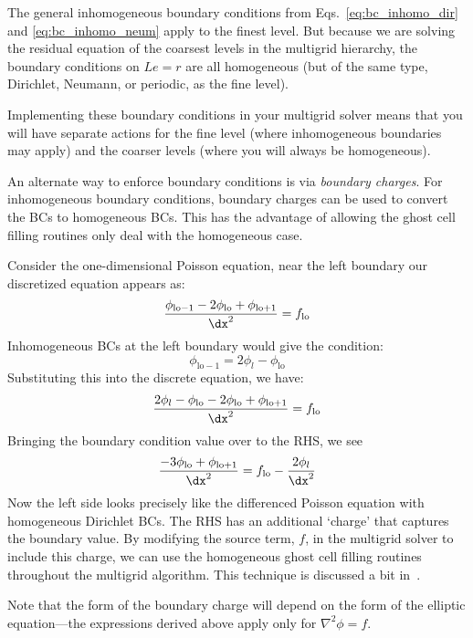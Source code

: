 The general inhomogeneous boundary conditions from
Eqs.~\ref{eq:bc_inhomo_dir} and \ref{eq:bc_inhomo_neum} apply to the
finest level.  But because we are solving the residual equation of the
coarsest levels in the multigrid hierarchy, the boundary conditions on
$Le = r$ are all homogeneous (but of the same type, Dirichlet,
Neumann, or periodic, as the fine level).

Implementing these boundary conditions in your multigrid solver means
that you will have separate actions for the fine level (where
inhomogeneous boundaries may apply) and the coarser levels (where you
will always be homogeneous).

An alternate way to enforce boundary conditions is via {\em boundary
  charges}.  For inhomogeneous boundary conditions, boundary charges
can be used to convert the BCs to homogeneous BCs.  This has the
advantage of allowing the ghost cell filling routines only deal with
the homogeneous case.

Consider the one-dimensional Poisson equation, near the left boundary
our discretized equation appears as:
\begin{equation}
\frac{\phi_\mathrm{lo-1} - 2\phi_\mathrm{lo} + \phi_\mathrm{lo+1}}{\dx^2}
 = f_\mathrm{lo}
\end{equation}
Inhomogeneous BCs at the left boundary would give the condition:
\begin{equation}
\phi_\mathrm{lo-1} = 2 \phi_l - \phi_\mathrm{lo}
\end{equation}
Substituting this into the discrete equation, we have:
\begin{equation}
\frac{2 \phi_l - \phi_\mathrm{lo} - 2\phi_\mathrm{lo} + \phi_\mathrm{lo+1}}{\dx^2}
 = f_\mathrm{lo}
\end{equation}
Bringing the boundary condition value over to the RHS, we see
\begin{equation}
\frac{- 3\phi_\mathrm{lo} + \phi_\mathrm{lo+1}}{\dx^2}
 = f_\mathrm{lo} - \frac{2\phi_l}{\dx^2}
\end{equation}
Now the left side looks precisely like the differenced Poisson equation
with homogeneous Dirichlet BCs.  The RHS has an additional `charge' that
captures the boundary value.  By modifying the source term, $f$, in the
multigrid solver to include this charge, we can use the homogeneous 
ghost cell filling routines throughout the multigrid algorithm.
This technique is discussed a bit in~\cite{colellanotes}.

Note that the form of the boundary charge will depend on the form of the
elliptic equation---the expressions derived above apply only for
$\nabla^2 \phi = f$.




